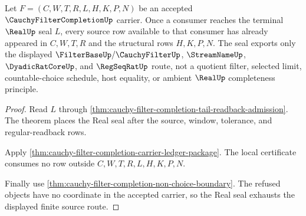 \begin{theorem}
\label{thm:cauchy-filter-completion-real-seal-source-exhaustion}
Let $F=(C,W,T,R,L,H,K,P,N)$ be an accepted $\CauchyFilterCompletionUp$ carrier. Once a consumer reaches the terminal $\RealUp$ seal $L$, every source row available to that consumer has already appeared in $C,W,T,R$ and the structural rows $H,K,P,N$. The seal exports only the displayed $\FilterBaseUp/\CauchyFilterUp$, $\StreamNameUp$, $\DyadicRatCoreUp$, and $\RegSeqRatUp$ route, not a quotient filter, selected limit, countable-choice schedule, host equality, or ambient $\RealUp$ completeness principle.
\end{theorem}
\begin{proof}
Read $L$ through \autoref{thm:cauchy-filter-completion-tail-readback-admission}. The theorem places the Real seal after the source, window, tolerance, and regular-readback rows.

Apply \autoref{thm:cauchy-filter-completion-carrier-ledger-package}. The local certificate consumes no row outside $C,W,T,R,L,H,K,P,N$.

Finally use \autoref{thm:cauchy-filter-completion-non-choice-boundary}. The refused objects have no coordinate in the accepted carrier, so the Real seal exhausts the displayed finite source route.
\end{proof}
